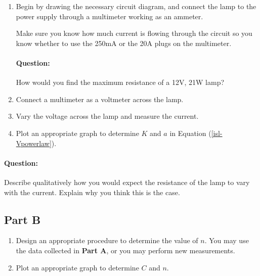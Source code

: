\begin{enumerate}
    \item  Begin by drawing the necessary circuit diagram, and connect the lamp to the power supply through a multimeter working as an ammeter. 
    
    \begin{imp} 
        Make sure you know how much current is flowing through the circuit so you know whether to use the 250mA or the 20A plugs on the multimeter. 
    \end{imp}
    
    \begin{question}
        \paragraph{Question:} How would you find the maximum resistance of a 12V, 21W lamp?
    \end{question}
    
    \item Connect a multimeter as a voltmeter across the lamp.
    
    \item Vary the voltage across the lamp and measure the current.
    
    \item Plot an appropriate graph to determine $K$ and $a$ in Equation (\ref{isl-Vpowerlaw}).
\end{enumerate}


\begin{question}
\paragraph{Question:} Describe qualitatively how you would expect the resistance of the lamp to vary with the current. Explain why you think this is the case.
\end{question}

\subsection*{Part B}

\begin{enumerate}
    \item Design an appropriate procedure to determine the value of $n$. You may use the  data collected in \textbf{Part A}, or you may perform new measurements.
    
    \item Plot an appropriate graph to determine $C$ and $n$.
\end{enumerate}



